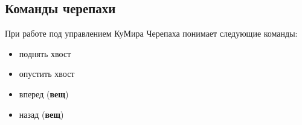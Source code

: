 \subsection{Команды черепахи}
При работе под управлением КуМира Черепаха понимает следующие команды:
\begin{itemize}
\item поднять хвост 
\item опустить хвост
\item вперед (\textbf{вещ}) 
\item назад (\textbf{вещ})
\end{itemize}